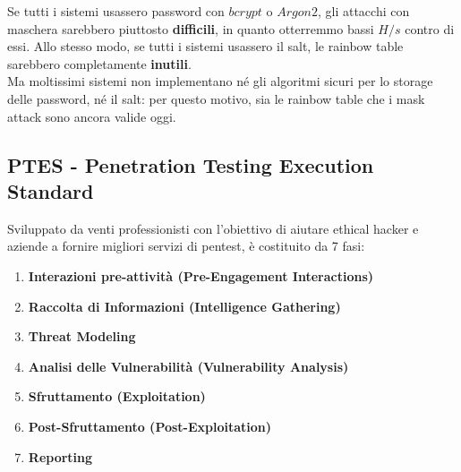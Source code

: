 \documentclass{article}
\begin{document}
Se tutti i sistemi usassero password con $bcrypt$ o $Argon2$, gli attacchi con maschera sarebbero piuttosto \textbf{difficili}, in quanto otterremmo bassi $H/s$ contro di essi. Allo stesso modo, se tutti i sistemi usassero il salt, le rainbow table sarebbero completamente \textbf{inutili}.\\
Ma moltissimi sistemi non implementano né gli algoritmi sicuri per lo storage 
delle password, né il salt: per questo motivo, sia le rainbow table che i mask attack sono ancora valide oggi.

\subsection{PTES - Penetration Testing Execution Standard}
Sviluppato da venti professionisti con l'obiettivo di aiutare ethical hacker e aziende a fornire migliori servizi di pentest, è costituito da 7 fasi:
\begin{enumerate}
    \item \textbf{Interazioni pre-attività (Pre-Engagement Interactions)}
    \item \textbf{Raccolta di Informazioni (Intelligence Gathering)}
    \item \textbf{Threat Modeling}
    \item \textbf{Analisi delle Vulnerabilità (Vulnerability Analysis)}
    \item \textbf{Sfruttamento (Exploitation)}
    \item \textbf{Post-Sfruttamento (Post-Exploitation)}
    \item \textbf{Reporting}
\end{enumerate}
\end{document}
